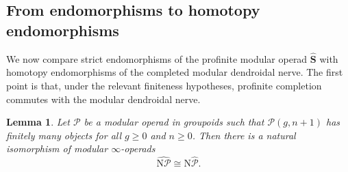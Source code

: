 \documentclass{amsart}
\newcommand{\bS}{\mathbf{S}}
\newcommand{\calP}{\mathcal{P}}
\newcommand{\nerve}{\mathrm{N}}
\newtheorem{lemma}[theorem]{Lemma}%
\theoremstyle{definition}
\numberwithin{equation}{section}
\begin{document}
\subsection{From endomorphisms to homotopy endomorphisms}\label{sec: homotopy endomorphisms}

We now compare strict endomorphisms of the profinite modular operad $\widehat{\bS}$ with homotopy endomorphisms of the completed modular dendroidal nerve. The first point is that, under the relevant finiteness hypotheses, profinite completion commutes with the modular dendroidal nerve.

\begin{lemma}\label{lemma: N commutes with completion for groupoids}
Let $\calP$ be a modular operad in groupoids such that $\calP(g,n+1)$ has finitely many objects for all $g\geq 0$ and $n\geq 0$. Then there is a natural isomorphism of modular $\infty$-operads
\[
\widehat{\nerve\calP}\cong \nerve\widehat{\calP}.
\]
\end{lemma}
\end{document}

